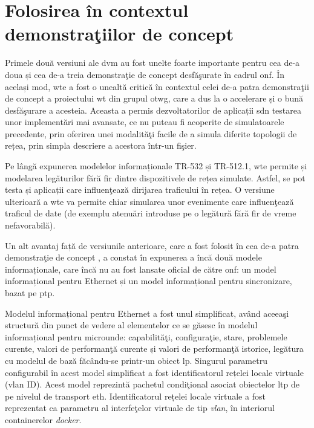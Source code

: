 \section{Folosirea în contextul demonstraţiilor de concept}

Primele două versiuni ale \gls{dvm} \cite{stancu2016default, stancu2017enabling} au fost unelte foarte importante pentru cea de-a doua și cea de-a treia demonstraţie de concept desfăşurate în cadrul \gls{onf}. În același mod, \gls{wte} a fost o unealtă critică în contextul celei de-a patra demonstraţii de concept a proiectului \gls{wt} din grupul \gls{otwg}, care a dus la o accelerare și o bună desfăşurare a acesteia. Aceasta a permis dezvoltatorilor de aplicații \gls{sdn} testarea unor implementări mai avansate, ce nu puteau fi acoperite de simulatoarele precedente, prin oferirea unei modalităţi facile de a simula diferite topologii de rețea, prin simpla descriere a acestora într-un fişier.

Pe lângă expunerea modelelor informaționale TR-532 și TR-512.1, \gls{wte} permite și modelarea legăturilor fără fir dintre dispozitivele de rețea simulate. Astfel, se pot testa și aplicații care influenţează dirijarea traficului în rețea. O versiune ulterioară a \gls{wte} va permite chiar simularea unor evenimente care influenţează traficul de date (de exemplu atenuări introduse pe o legătură fără fir de vreme nefavorabilă).

Un alt avantaj față de versiunile anterioare, care a fost folosit în cea de-a patra demonstraţie de concept \cite{onf2017_poc4}, a constat în expunerea a încă două modele informaționale, care încă nu au fost lansate oficial de către \gls{onf}: un model informațional pentru Ethernet și un model informațional pentru sincronizare, bazat pe \gls{ptp}.

Modelul informațional pentru Ethernet a fost unul simplificat, având aceeaşi structură din punct de vedere al elementelor ce se găsesc în modelul informațional pentru microunde: capabilităţi, configuraţie, stare, problemele curente, valori de performanţă curente și valori de performanţă istorice, legătura cu modelul de bază făcându-se printr-un obiect \gls{lp}. Singurul parametru configurabil în acest model simplificat a fost identificatorul rețelei locale virtuale (\gls{vlan} ID). Acest model reprezintă pachetul condiţional asociat obiectelor \gls{ltp} de pe nivelul de transport \gls{eth}. Identificatorul rețelei locale virtuale a fost reprezentat ca parametru al interfeţelor virtuale de tip \textit{vlan}, în interiorul containerelor \textit{docker}.

